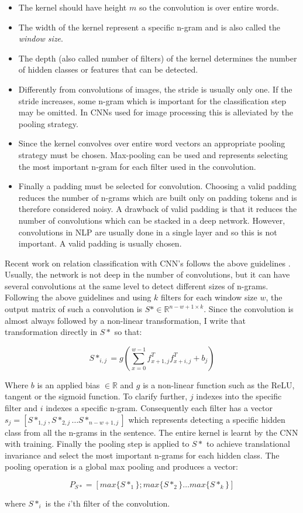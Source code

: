\begin{itemize}
\item The kernel should have height $m$ so the convolution is over entire words.

\item The width of the kernel represent a specific n-gram and is also called the \emph{window size}.

\item The depth (also called number of filters) of the kernel determines the number of hidden classes or features that can be detected. 

\item Differently from convolutions of images, the stride is usually only one. If the stride increases, some n-gram which is important for the classification step may be omitted. In CNNs used for image processing this is alleviated by the pooling strategy.

\item Since the kernel convolves over entire word vectors an appropriate pooling strategy must be chosen. Max-pooling can be used and represents selecting the most important n-gram for each filter used in the convolution. 

\item Finally a padding must be selected for convolution. Choosing a valid padding reduces the number of n-grams which are built only on padding tokens and is therefore considered noisy. A drawback of valid padding is that it reduces the number of convolutions which can be stacked in a deep network. However, convolutions in NLP are usually done in a single layer and so this is not important. A valid padding is usually chosen.

\end{itemize}   

Recent work on relation classification with CNN's follows the above guidelines \cite{att_cn}\cite{re_cnn}\cite{cnn_rank}. Usually, the network is not deep in the number of convolutions, but it can have several convolutions at the same level to detect different sizes of n-grams. Following the above guidelines and using $k$ filters for each window size $w$, the output matrix of such a convolution is $S* \in \mathbb{R}^{n-w+1 \times k}$. Since the convolution is almost always followed by a non-linear transformation, I write that transformation directly in $S*$ so that:

$$
S*_{i,j} = g( \sum_{x=0}^{w-1} f_{x+1,j}^{T} f_{x+i,j}^{T} + b_j)
$$

Where $b$ is an applied bias $\in \mathbb{R}$ and $g$ is a non-linear function such as the ReLU, tangent or the sigmoid function. 
To clarify further, $j$ indexes into the specific filter and $i$ indexes a specific n-gram. Consequently each filter has a vector $s_j = [S*_{1,j}, S*_{2,j} \ldots S*_{n-w+1,j}]$ which represents detecting a specific hidden class from all the n-grams in the sentence. The entire kernel is learnt by the CNN with training. 
Finally the pooling step is applied to $S*$ to achieve translational invariance and select the most important n-grams for each hidden class. The pooling operation is a global max pooling and produces a vector:

$$
P_{S*} = [max\{S*_{1}\} ; max\{S*_{2}\} \ldots max\{S*_k\}]
$$

where $S*_{i}$ is the $i$'th filter of the convolution.









